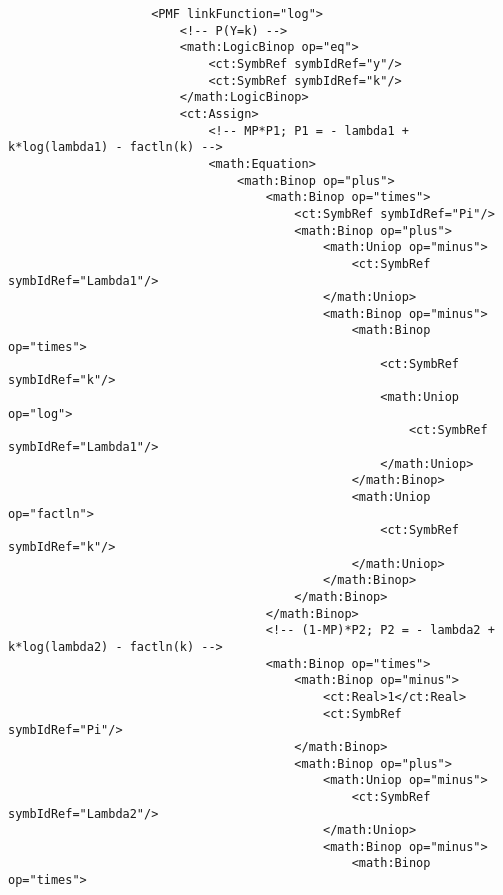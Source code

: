 \begin{lstlisting}
                    <PMF linkFunction="log">
                        <!-- P(Y=k) -->
                        <math:LogicBinop op="eq">
                            <ct:SymbRef symbIdRef="y"/>
                            <ct:SymbRef symbIdRef="k"/>
                        </math:LogicBinop>
                        <ct:Assign>
                            <!-- MP*P1; P1 = - lambda1 + k*log(lambda1) - factln(k) -->
                            <math:Equation>
                                <math:Binop op="plus">
                                    <math:Binop op="times">
                                        <ct:SymbRef symbIdRef="Pi"/>
                                        <math:Binop op="plus">
                                            <math:Uniop op="minus">
                                                <ct:SymbRef symbIdRef="Lambda1"/>
                                            </math:Uniop>
                                            <math:Binop op="minus">
                                                <math:Binop op="times">
                                                    <ct:SymbRef symbIdRef="k"/>
                                                    <math:Uniop op="log">
                                                        <ct:SymbRef symbIdRef="Lambda1"/>
                                                    </math:Uniop>
                                                </math:Binop>
                                                <math:Uniop op="factln">
                                                    <ct:SymbRef symbIdRef="k"/>
                                                </math:Uniop>
                                            </math:Binop>
                                        </math:Binop>
                                    </math:Binop>
                                    <!-- (1-MP)*P2; P2 = - lambda2 + k*log(lambda2) - factln(k) -->
                                    <math:Binop op="times">
                                        <math:Binop op="minus">
                                            <ct:Real>1</ct:Real>
                                            <ct:SymbRef symbIdRef="Pi"/>
                                        </math:Binop>
                                        <math:Binop op="plus">
                                            <math:Uniop op="minus">
                                                <ct:SymbRef symbIdRef="Lambda2"/>
                                            </math:Uniop>
                                            <math:Binop op="minus">
                                                <math:Binop op="times">

\end{lstlisting}
